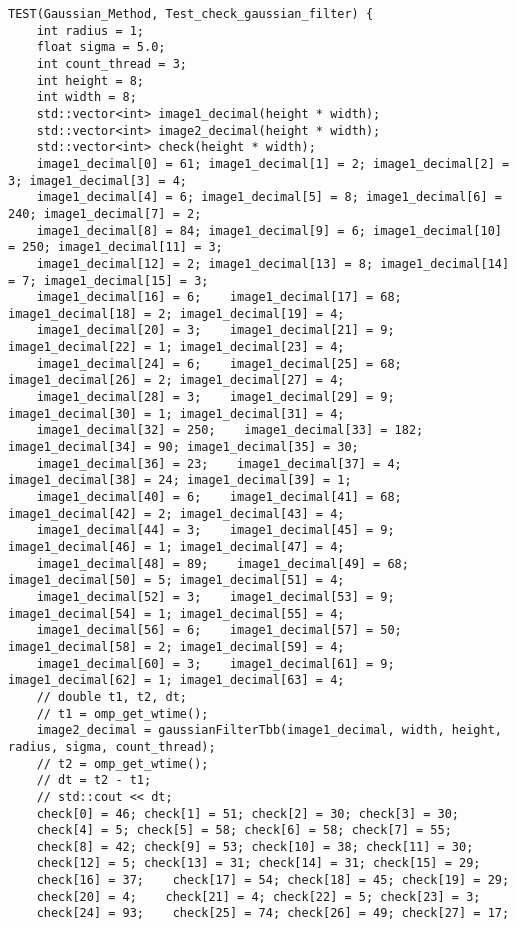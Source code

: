 \documentclass{report}
\begin{document}
\begin{lstlisting}
TEST(Gaussian_Method, Test_check_gaussian_filter) {
    int radius = 1;
    float sigma = 5.0;
    int count_thread = 3;
    int height = 8;
    int width = 8;
    std::vector<int> image1_decimal(height * width);
    std::vector<int> image2_decimal(height * width);
    std::vector<int> check(height * width);
    image1_decimal[0] = 61; image1_decimal[1] = 2; image1_decimal[2] = 3; image1_decimal[3] = 4;
    image1_decimal[4] = 6; image1_decimal[5] = 8; image1_decimal[6] = 240; image1_decimal[7] = 2;
    image1_decimal[8] = 84; image1_decimal[9] = 6; image1_decimal[10] = 250; image1_decimal[11] = 3;
    image1_decimal[12] = 2; image1_decimal[13] = 8; image1_decimal[14] = 7; image1_decimal[15] = 3;
    image1_decimal[16] = 6;    image1_decimal[17] = 68; image1_decimal[18] = 2; image1_decimal[19] = 4;
    image1_decimal[20] = 3;    image1_decimal[21] = 9; image1_decimal[22] = 1; image1_decimal[23] = 4;
    image1_decimal[24] = 6;    image1_decimal[25] = 68; image1_decimal[26] = 2; image1_decimal[27] = 4;
    image1_decimal[28] = 3;    image1_decimal[29] = 9; image1_decimal[30] = 1; image1_decimal[31] = 4;
    image1_decimal[32] = 250;    image1_decimal[33] = 182; image1_decimal[34] = 90; image1_decimal[35] = 30;
    image1_decimal[36] = 23;    image1_decimal[37] = 4; image1_decimal[38] = 24; image1_decimal[39] = 1;
    image1_decimal[40] = 6;    image1_decimal[41] = 68; image1_decimal[42] = 2; image1_decimal[43] = 4;
    image1_decimal[44] = 3;    image1_decimal[45] = 9; image1_decimal[46] = 1; image1_decimal[47] = 4;
    image1_decimal[48] = 89;    image1_decimal[49] = 68; image1_decimal[50] = 5; image1_decimal[51] = 4;
    image1_decimal[52] = 3;    image1_decimal[53] = 9; image1_decimal[54] = 1; image1_decimal[55] = 4;
    image1_decimal[56] = 6;    image1_decimal[57] = 50; image1_decimal[58] = 2; image1_decimal[59] = 4;
    image1_decimal[60] = 3;    image1_decimal[61] = 9; image1_decimal[62] = 1; image1_decimal[63] = 4;
    // double t1, t2, dt;
    // t1 = omp_get_wtime();
    image2_decimal = gaussianFilterTbb(image1_decimal, width, height, radius, sigma, count_thread);
    // t2 = omp_get_wtime();
    // dt = t2 - t1;
    // std::cout << dt;
    check[0] = 46; check[1] = 51; check[2] = 30; check[3] = 30;
    check[4] = 5; check[5] = 58; check[6] = 58; check[7] = 55;
    check[8] = 42; check[9] = 53; check[10] = 38; check[11] = 30;
    check[12] = 5; check[13] = 31; check[14] = 31; check[15] = 29;
    check[16] = 37;    check[17] = 54; check[18] = 45; check[19] = 29;
    check[20] = 4;    check[21] = 4; check[22] = 5; check[23] = 3;
    check[24] = 93;    check[25] = 74; check[26] = 49; check[27] = 17;

\end{lstlisting}
\end{document}
